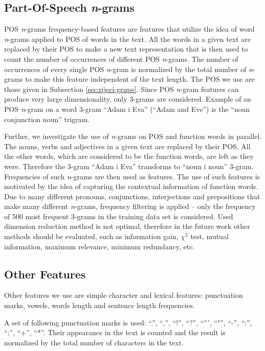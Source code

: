 \documentclass{llncs}
\begin{document}
\subsection{Part-Of-Speech \emph{n}-grams}
\label{sec:ngrami-tipova}
POS \emph{n}-grams frequency-based features are features that utilize the idea of
word \emph{n}-grams applied to POS of words in the text. All the words in a given
text are replaced by their POS to make a new text representation that is then
used to count the number of occurrences of different POS \emph{n}-grams. The
number of occurrences of every single POS \emph{n}-gram is normalized by the
total number of \emph{n}-grams to make this feature independent of the text
length. The POS we use are those given in Subsection \ref{sec:rijeci-grupe}.
Since POS \emph{n}-gram features can produce very large dimensionality, only
3-grams are considered. Example of an POS \emph{n}-gram on a word 3-gram ``Adam i
Eva'' (``Adam and Eve'') is the ``noun conjunction noun'' trigram.

Further, we investigate the use of \emph{n}-grams on POS and function words in
parallel. The nouns, verbs and adjectives in a given text are replaced by their
POS. All the other words, which are considered to be the function words, are
left as they were. Therefore the 3-gram ``Adam i Eva'' transforms to ``noun i
noun'' 3-gram. Frequencies of such \emph{n}-grams are then used as features.
The use of such features is motivated by the idea of capturing the contextual
information of function words. Due to many different pronouns, conjunctions,
interjections and prepositions that make many different \emph{n}-grams, frequency
filtering is applied -- only the frequency of 500 most frequent 3-grams in the
training data set is considered. Used dimension reduction method is not optimal,
therefore in the future work other methods should be evaluated, such as
information gain, $\chi^2$ test, mutual information, maximum relevance, minimum
redundancy, etc.

\subsection{Other Features}
\label{sec:znacajke-manje}
Other features we use are simple character and lexical features:
punctuation marks, vowels, words length and sentence length frequencies.

A set of following punctuation marks is used: ``.'', ``,'', ``!'', ``?'',
``''', ``"'', ``-'', ``:'', ``;'', ``+'', ``*''. Their appearance in the text is counted and
the result is normalized by the total number of characters in the text. 
\end{document}
